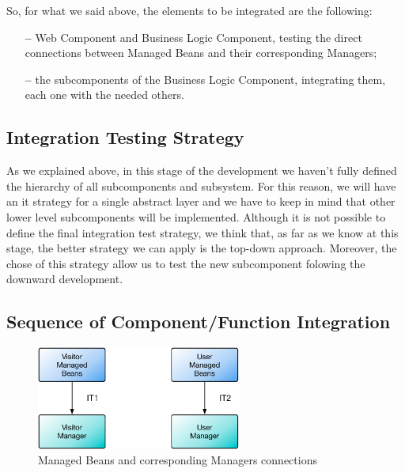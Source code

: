 So, for what we said above, the elements to be integrated are the following:

\begin{itemize}

\item[\textbf{--}] Web Component and Business Logic Component, testing the  direct connections between Managed Beans and their corresponding Managers;

\item[\textbf{--}] the subcomponents of the Business Logic Component, integrating them, each one with the needed others.

\end{itemize}

\subsection{Integration Testing Strategy}
As we explained above, in this stage of the development we haven't fully defined the hierarchy of all subcomponents and subsystem.
For this reason, we will have an \acl{it} strategy for a single abstract layer and we have to keep in mind that other lower level subcomponents will be implemented.
Although it is not possible to define the final integration test strategy, we think that, as far as we know at this stage, the better strategy we can apply is the top-down approach.
Moreover, the chose of this strategy allow us to test the new subcomponent folowing the downward development.

\subsection{Sequence of Component/Function Integration}

\vspace{40pt}

\begin{figure}[htbp]
\centering
\includegraphics[width=0.6\textwidth]{Images/IT1-2.pdf}
\vspace{16pt}
\caption{Managed Beans and corresponding Managers connections}
\label{fig:it1-2}
\end{figure}


